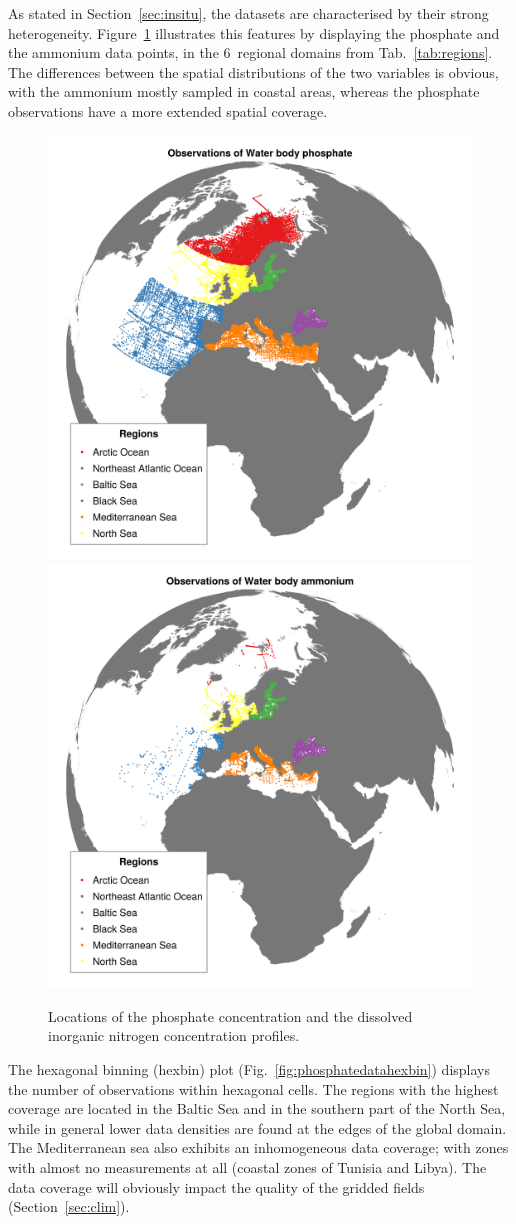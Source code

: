 \documentclass[essd, manuscript]{copernicus}
\begin{document}
As stated in Section~\ref{sec:insitu}, the datasets are characterised by their strong heterogeneity. Figure~\ref{fig:phosphatedata} illustrates this features by displaying the phosphate and the ammonium data points, in the 6~regional domains from Tab.~\ref{tab:regions}. The differences between the spatial distributions of the two variables is obvious, with the ammonium mostly sampled in coastal areas, whereas the phosphate observations have a more extended spatial coverage.

\begin{figure}[t]
\includegraphics[width=.49\textwidth]{observations_Water_body_phosphate.png}\includegraphics[width=.49\textwidth]{observations_Water_body_ammonium.png}
\caption{Locations of the phosphate concentration and the dissolved inorganic nitrogen concentration profiles.\label{fig:phosphatedata}}
\end{figure}

The hexagonal binning (hexbin) plot (Fig.~\ref{fig:phosphatedatahexbin}) displays the number of observations within hexagonal cells. The regions with the highest coverage are located in the Baltic Sea and in the southern part of the North Sea, while in general lower data densities are found at the edges of the global domain. The Mediterranean sea also exhibits an inhomogeneous data coverage; with zones with almost no measurements at all (coastal zones of Tunisia and Libya). The data coverage will obviously impact the quality of the gridded fields (Section~\ref{sec:clim}).
\end{document}
